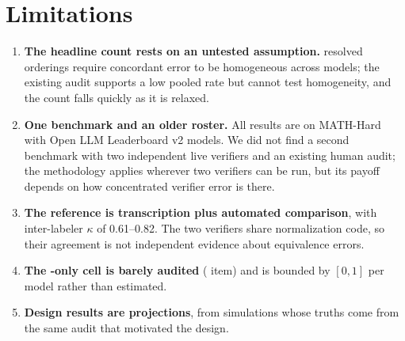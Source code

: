 \section{Limitations}
\label{sec:limitations}

\begin{enumerate}\itemsep2pt
  \item \textbf{The headline count rests on an untested assumption.}
  \nJointComb{} resolved orderings require concordant error to be homogeneous
  across models; the existing audit supports a low pooled rate but cannot
  test homogeneity, and the count falls quickly as it is relaxed.
  \item \textbf{One benchmark and an older roster.} All results are on
  MATH-Hard with Open LLM Leaderboard v2 models. We did not find a second
  benchmark with two independent live verifiers and an existing human audit;
  the methodology applies wherever two verifiers can be run, but its payoff
  depends on how concentrated verifier error is there.
  \item \textbf{The reference is transcription plus automated comparison},
  with inter-labeler $\kappa$ of 0.61--0.82. The two verifiers share
  normalization code, so their agreement is not independent evidence about
  equivalence errors.
  \item \textbf{The -only cell is barely audited}
  (\nCellZeroOneN{} item) and is bounded by $[0,1]$ per model rather than
  estimated.
  \item \textbf{Design results are projections}, from simulations whose
  truths come from the same audit that motivated the design.
\end{enumerate}
